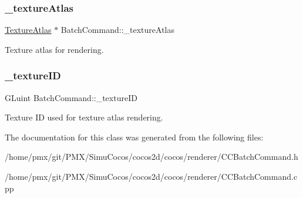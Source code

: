\subsubsection{\texorpdfstring{\+\_\+texture\+Atlas}{\_textureAtlas}}
{\footnotesize\ttfamily \hyperlink{classTextureAtlas}{Texture\+Atlas} $\ast$ Batch\+Command\+::\+\_\+texture\+Atlas\hspace{0.3cm}{\ttfamily [protected]}}

Texture atlas for rendering. \mbox{\label{classBatchCommand_abfc6a1e43ec6c7c030699d5a057c6865}} 
\subsubsection{\texorpdfstring{\+\_\+texture\+ID}{\_textureID}}
{\footnotesize\ttfamily G\+Luint Batch\+Command\+::\+\_\+texture\+ID\hspace{0.3cm}{\ttfamily [protected]}}

Texture ID used for texture atlas rendering. 

The documentation for this class was generated from the following files\+:\begin{DoxyCompactItemize}
\item 
/home/pmx/git/\+P\+M\+X/\+Simu\+Cocos/cocos2d/cocos/renderer/C\+C\+Batch\+Command.\+h\item 
/home/pmx/git/\+P\+M\+X/\+Simu\+Cocos/cocos2d/cocos/renderer/C\+C\+Batch\+Command.\+cpp\end{DoxyCompactItemize}
